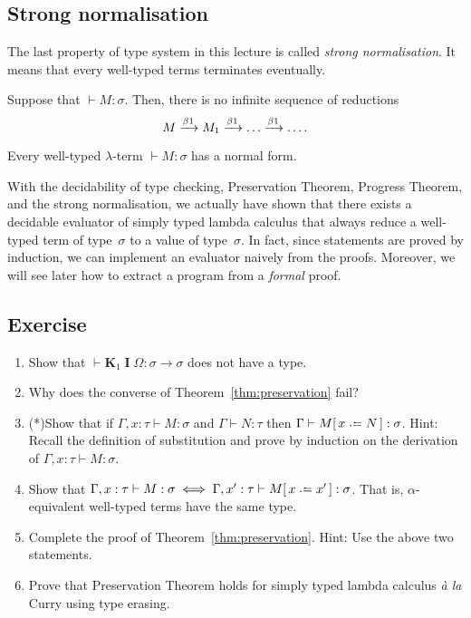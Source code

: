 \subsection{Strong normalisation}
The last property of type system in this lecture is called \emph{strong
  normalisation}. It means that every well-typed terms terminates eventually. 
\begin{theorem}
  Suppose that ${}\vdash M : \sigma$. Then,
  there is no infinite sequence of reductions
  \[
    M \xrightarrow{\beta1} M_1 \xrightarrow{\beta1} \dots \xrightarrow{\beta1} \dots.
  \]
\end{theorem}
\begin{corollary}
  Every well-typed $\lambda$-term ${}\vdash M:\sigma$ has a normal form.
\end{corollary}
With the decidability of type checking, Preservation Theorem, Progress Theorem,
and the strong normalisation, we actually have shown that there exists a
decidable evaluator of simply typed lambda calculus that always reduce a
well-typed term of type~$\sigma$ to a value of type~$\sigma$. In fact, since
statements are proved by induction, we can implement an evaluator naively from
the proofs. Moreover, we will see later how to extract a program from a
\emph{formal} proof.
\subsection*{Exercise}
\begin{enumerate}
  \item Show that $\vdash \mathbf{K}_1\;\mathbf{I}\;\Omega : \sigma \to \sigma$
    does not have a type.
  \item Why does the converse of Theorem~\ref{thm:preservation} fail?
  \item (*)Show that if $\Gamma, x : \tau \vdash M : \sigma$
    and $\Gamma \vdash N : \tau$ then $\Gamma \vdash M\subst{x}{N} : \sigma$.
    Hint: Recall the definition of substitution and prove by induction
    on the derivation of $\Gamma, x:\tau\vdash M : \sigma$.
  \item Show that $\Gamma, x : \tau \vdash M :\sigma
    \iff \Gamma, x' : \tau \vdash M\subst{x}{x'} : \sigma$. That is,
    $\alpha$-equivalent well-typed terms have the same type.
  \item Complete the proof of Theorem~\ref{thm:preservation}. Hint: Use the
    above two statements.
  \item Prove that Preservation Theorem holds for simply typed lambda calculus
    \textit{\`a la} Curry using type erasing.
\end{enumerate}
